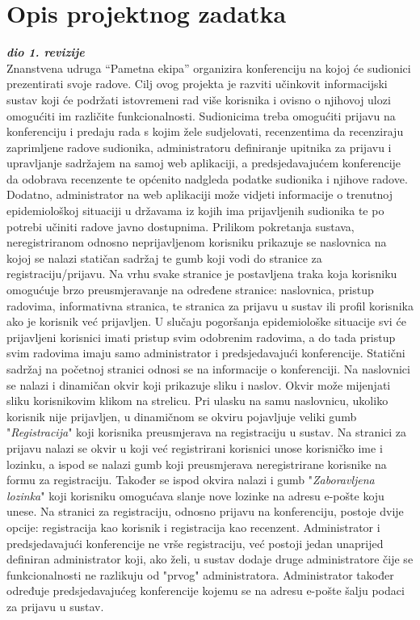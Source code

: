 \chapter{Opis projektnog zadatka}
		
		\textbf{\textit{dio 1. revizije}}\\

		Znanstvena udruga “Pametna ekipa” organizira konferenciju na kojoj će sudionici prezentirati svoje radove. Cilj ovog projekta je razviti učinkovit informacijski sustav koji će podržati istovremeni rad više korisnika i ovisno o njihovoj ulozi omogućiti im različite funkcionalnosti. Sudionicima treba omogućiti prijavu na konferenciju i predaju rada s kojim žele sudjelovati, recenzentima da recenziraju zaprimljene radove sudionika, administratoru definiranje upitnika za prijavu i upravljanje sadržajem na samoj web aplikaciji, a predsjedavajućem konferencije da odobrava recenzente te općenito nadgleda podatke sudionika i njihove radove. Dodatno, administrator na web aplikaciji može vidjeti informacije o trenutnoj epidemiološkoj situaciji u državama iz kojih ima prijavljenih sudionika te po potrebi učiniti radove javno dostupnima.
		\newline
		\newline
		\indent Prilikom pokretanja sustava, neregistriranom odnosno neprijavljenom korisniku prikazuje se naslovnica na kojoj se nalazi statičan sadržaj te gumb koji vodi do stranice za registraciju/prijavu. Na vrhu svake stranice  je postavljena traka koja korisniku omogućuje brzo preusmjeravanje na određene stranice: naslovnica, pristup radovima, informativna stranica, te stranica za prijavu u sustav ili profil korisnika ako je korisnik već prijavljen. U slučaju pogoršanja epidemiološke situacije svi će prijavljeni korisnici imati pristup svim odobrenim radovima, a do tada pristup svim radovima imaju samo administrator i predsjedavajući konferencije. Statični sadržaj na početnoj stranici odnosi se na informacije o konferenciji. Na naslovnici se nalazi i dinamičan okvir koji prikazuje sliku i naslov. Okvir može mijenjati sliku korisnikovim klikom na strelicu. Pri ulasku na samu naslovnicu, ukoliko korisnik nije prijavljen, u dinamičnom se okviru pojavljuje veliki gumb "\textit{Registracija}" koji korisnika preusmjerava na registraciju u sustav. 
		\newline
		\newline
		\indent Na stranici za prijavu nalazi se okvir u koji već registrirani korisnici unose korisničko ime i lozinku, a ispod se nalazi gumb koji preusmjerava neregistrirane korisnike na formu za registraciju. Također se ispod okvira nalazi i gumb "\textit{Zaboravljena lozinka}" koji korisniku omogućava slanje nove lozinke na adresu e-pošte koju unese. Na stranici za registraciju, odnosno prijavu na konferenciju, postoje dvije opcije: registracija kao korisnik i registracija kao recenzent. Administrator i predsjedavajući konferencije ne vrše registraciju, već postoji jedan unaprijed definiran administrator koji, ako želi, u sustav dodaje druge administratore čije se funkcionalnosti ne razlikuju od "prvog" administratora. Administrator također određuje predsjedavajućeg konferencije kojemu se na adresu e-pošte šalju podaci za prijavu u sustav.
